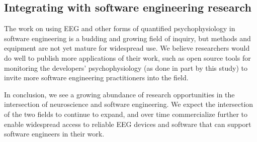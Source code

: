 \subsection{Integrating with software engineering research}

The work on using EEG and other forms of quantified psychophysiology in software engineering is a budding and growing field of inquiry, but methods and equipment are not yet mature for widespread use. We believe researchers would do well to publish more applications of their work, such as open source tools for monitoring the developers' psychophysiology (as done in part by this study) to invite more software engineering practitioners into the field.


In conclusion, we see a growing abundance of research opportunities in the intersection of neuroscience and software engineering. We expect the intersection of the two fields to continue to expand, and over time commercialize further to enable widespread access to reliable EEG devices and software that can support software engineers in their work.
